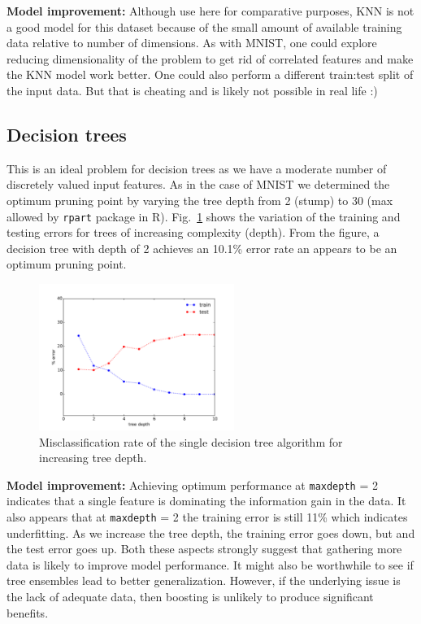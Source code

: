 \documentclass[10pt,letterpaper]{article}
\begin{document}
{\bf Model improvement:} Although use here for comparative purposes, KNN is not a good model for this dataset because of the small amount of available training data relative to number of dimensions. As with MNIST, one could explore reducing dimensionality of the problem to get rid of correlated features and make the KNN model work better. One could also perform a different train:test split of the input data. But that is cheating and is likely not possible in real life :)
\subsection{Decision trees}
This is an ideal problem for decision trees as we have a moderate number of discretely valued input features. As in the case of MNIST we determined the optimum pruning point by varying the tree depth from 2 (stump) to 30 (max allowed by {\tt rpart} package in R). Fig.~\ref{dtreeion1} shows the variation of the training and testing errors for trees of increasing complexity (depth). From the figure, a decision tree with depth of 2 achieves an 10.1\% error rate an appears to be an optimum pruning point.   
\begin{figure}[!tbp]
	\begin{center}
	\includegraphics[width=2.5in]{../results/ionosphere/dtree/train_test_error_vs_depth.pdf}
	\end{center}
	\caption{Misclassification rate of the single decision tree algorithm for increasing tree depth. \label{dtreeion1}}
\end{figure}

{\bf Model improvement:} Achieving optimum performance at {\tt maxdepth} = 2 indicates that a single feature is dominating the information gain in the data. It also appears that at {\tt maxdepth} = 2 the training error is still 11\% which indicates underfitting. As we increase the tree depth, the training error goes down, but and the test error goes up. Both these aspects strongly suggest that gathering more data is likely to improve model performance. It might also be worthwhile to see if tree ensembles lead to better generalization. However, if the underlying issue is the lack of adequate data, then boosting is unlikely to produce significant benefits.  
\end{document}
